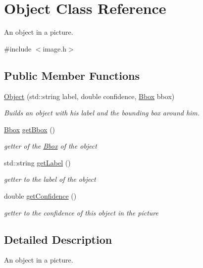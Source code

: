 \hypertarget{class_object}{}\section{Object Class Reference}
\label{class_object}


An object in a picture.  




{\ttfamily \#include $<$image.\+h$>$}

\subsection*{Public Member Functions}
\begin{DoxyCompactItemize}
\item 
\hyperlink{class_object_ab3e642ef6f10a138adc9d519979d2944}{Object} (std\+::string label, double confidence, \hyperlink{class_bbox}{Bbox} bbox)
\begin{DoxyCompactList}\small\item\em Builds an object with his label and the bounding box around him. \end{DoxyCompactList}\item 
\hyperlink{class_bbox}{Bbox} \hyperlink{class_object_a8fde7ce6bc7c391ff9b87b3557c9bb80}{get\+Bbox} ()
\begin{DoxyCompactList}\small\item\em getter of the \hyperlink{class_bbox}{Bbox} of the object \end{DoxyCompactList}\item 
std\+::string \hyperlink{class_object_a269462ff63fbdb49c1072936b13146a4}{get\+Label} ()
\begin{DoxyCompactList}\small\item\em getter to the label of the object \end{DoxyCompactList}\item 
double \hyperlink{class_object_aa49a09c5b33126340f35eb4ecc0ebf96}{get\+Confidence} ()
\begin{DoxyCompactList}\small\item\em getter to the confidence of this object in the picture \end{DoxyCompactList}\end{DoxyCompactItemize}


\subsection{Detailed Description}
An object in a picture. 


